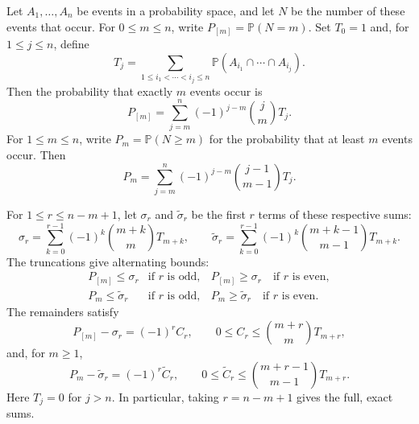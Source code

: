 \documentclass[a4paper,11pt,abstracton]{scrartcl}
\theoremstyle{dotlessP}
\theoremstyle{dotlessS}
\theoremstyle{remark}
\theoremstyle{definition}
\begin{document}
\begin{problem_box}
Let $A_1,\ldots,A_n$ be events in a probability space, and let $N$ be the number of these events that occur. For $0\leq m\leq n$, write $P_{[m]}=\mathbb{P}(N=m)$. Set $T_0=1$ and, for $1\leq j\leq n$, define
\[
  T_j=\sum_{1\leq i_1<\cdots<i_j\leq n}
  \mathbb{P}(A_{i_1}\cap\cdots\cap A_{i_j}).
\]
Then the probability that exactly $m$ events occur is
\[
  P_{[m]}=\sum_{j=m}^{n}(-1)^{j-m}\binom{j}{m}T_j.
\]
For $1\leq m\leq n$, write $P_m=\mathbb{P}(N\geq m)$ for the probability that at least $m$ events occur. Then
\[
  P_m=\sum_{j=m}^{n}(-1)^{j-m}\binom{j-1}{m-1}T_j.
\]

For $1\leq r\leq n-m+1$, let $\sigma_r$ and $\widetilde{\sigma}_r$ be the first $r$ terms of these respective sums:
\[
  \sigma_r=\sum_{k=0}^{r-1}(-1)^k\binom{m+k}{m}T_{m+k},
  \qquad
  \widetilde{\sigma}_r=\sum_{k=0}^{r-1}(-1)^k\binom{m+k-1}{m-1}T_{m+k}.
\]
The truncations give alternating bounds:
\[
  \begin{array}{lll}
    P_{[m]}\leq\sigma_r &\text{if $r$ is odd}, &
    P_{[m]}\geq\sigma_r \quad\text{if $r$ is even},\\[1mm]
    P_m\leq\widetilde{\sigma}_r &\text{if $r$ is odd}, &
    P_m\geq\widetilde{\sigma}_r \quad\text{if $r$ is even}.
  \end{array}
\]
The remainders satisfy
\[
  P_{[m]}-\sigma_r=(-1)^r C_r,
  \qquad 0\leq C_r\leq\binom{m+r}{m}T_{m+r},
\]
and, for $m\geq1$,
\[
  P_m-\widetilde{\sigma}_r=(-1)^r\widetilde{C}_r,
  \qquad 0\leq\widetilde{C}_r\leq\binom{m+r-1}{m-1}T_{m+r}.
\]
Here $T_j=0$ for $j>n$. In particular, taking $r=n-m+1$ gives the full, exact sums.
\end{problem_box}
\end{document}
